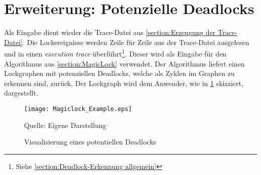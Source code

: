\section{Erweiterung: Potenzielle Deadlocks}
\label{section:Erweiterung: Potenzielle Deadlocks}
Als Eingabe dient wieder die Trace-Datei aus \cref{section:Erzeugung der
Trace-Datei}. Die Lockereignisse werden Zeile für Zeile aus der Trace-Datei
ausgelesen und in einen \emph{execution trace} überführt\footnote{Siehe
\cref{section:Deadlock-Erkennung allgemein}}. Dieser wird als Eingabe für den
Algorithmus aus \cref{section:MagicLock} verwendet. Der Algorithmus liefert
einen Lockgraphen mit potenziellen Deadlocks, welche als Zyklen im Graphen zu
erkennen sind, zurück. Der Lockgraph wird dem Anwender, wie in
\cref{fig:Magiclock_Example} skizziert, dargestellt.
\begin{figure}[ht]
  \begin{center}
    \texttt{[image: Magiclock\_Example.eps]}
  \end{center}
  \footnotesize\sffamily Quelle: Eigene Darstellung
  \caption{Visualisierung eines potentiellen Deadlocks}
  \label{fig:Magiclock_Example}
\end{figure}